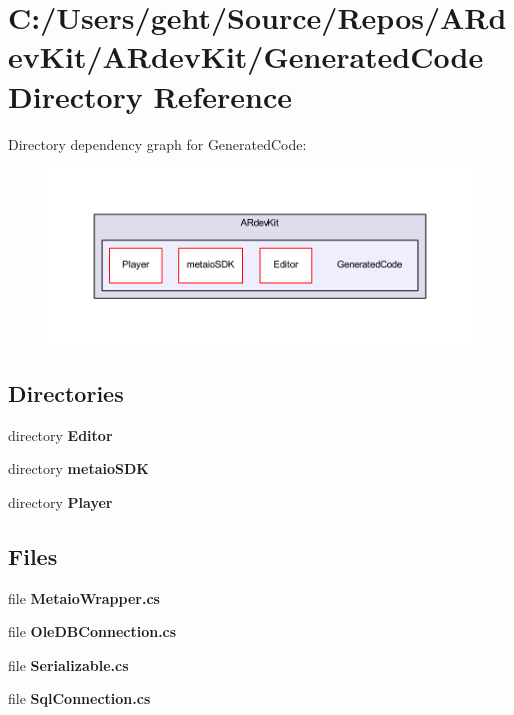 \section{C\-:/\-Users/geht/\-Source/\-Repos/\-A\-Rdev\-Kit/\-A\-Rdev\-Kit/\-Generated\-Code Directory Reference}
\label{dir_0eea96936422df97555706f66d832486}
Directory dependency graph for Generated\-Code\-:
\nopagebreak
\begin{figure}[H]
\begin{center}
\leavevmode
\includegraphics[width=350pt]{dir_0eea96936422df97555706f66d832486_dep}
\end{center}
\end{figure}
\subsection*{Directories}
\begin{DoxyCompactItemize}
\item 
directory {\bf Editor}
\item 
directory {\bf metaio\-S\-D\-K}
\item 
directory {\bf Player}
\end{DoxyCompactItemize}
\subsection*{Files}
\begin{DoxyCompactItemize}
\item 
file {\bfseries Metaio\-Wrapper.\-cs}
\item 
file {\bfseries Ole\-D\-B\-Connection.\-cs}
\item 
file {\bfseries Serializable.\-cs}
\item 
file {\bfseries Sql\-Connection.\-cs}
\end{DoxyCompactItemize}

